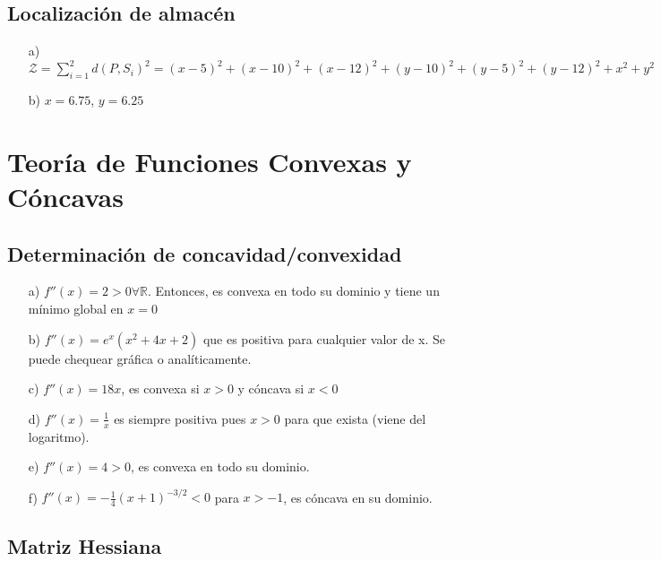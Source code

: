 \documentclass[12pt]{article}
\begin{document}
\subsection{Localización de almacén}

\begin{itemize}
    \item[a)] $\mathcal{Z} = \sum_{i=1}^2 d(P,S_i)^2 =  (x-5)^2 + (x-10)^2 + (x-12)^2 + (y-10)^2 + (y-5)^2 + (y-12)^2 + x^2 + y^2$
    \item[b)] $x = 6.75$, $y = 6.25$
\end{itemize}

\section*{Teoría de Funciones Convexas y Cóncavas}

\subsection{Determinación de concavidad/convexidad}

\begin{itemize}
    \item[a)] $f''(x) = 2 > 0 \forall \mathbb{R}$. Entonces, es convexa en todo su dominio y tiene un mínimo global en $x = 0$
    \item[b)] $f''(x) = e^{x} (x^2 + 4x + 2)$ que es positiva para cualquier valor de x. Se puede chequear gráfica o analíticamente.
    \item[c)] $f''(x) = 18 x$, es convexa si $x >0$ y cóncava si $x < 0$
    \item[d)] $f''(x) = \frac{1}{x}$ es siempre positiva pues $ x > 0$ para que exista (viene del logaritmo).
    \item[e)] $f''(x) = 4 > 0$, es convexa en todo su dominio.
    \item[f)] $f''(x) = -\frac{1}{4}(x+1)^{-3/2} < 0$ para $x > -1$, es cóncava en su dominio.
\end{itemize}

\subsection{Matriz Hessiana}
\end{document}
